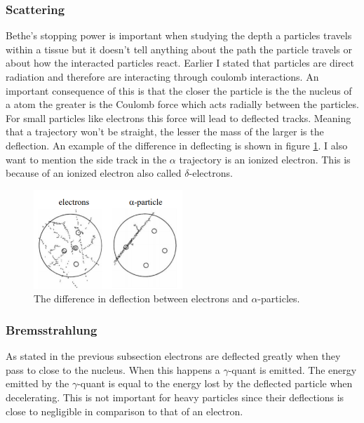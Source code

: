 \documentclass[jmp, amsmath, amssymb, reprint]{article}
\numberwithin{equation}{section}
\begin{document}
\begin{multicols}{2}
\subsubsection{Scattering}

Bethe's stopping power is important when studying the depth a particles travels within a tissue but it doesn't tell anything about the path the particle travels or about how the interacted particles react. Earlier I stated that particles are direct radiation and therefore are interacting through coulomb interactions. An important consequence of this is that the closer the particle is the the nucleus of a atom the greater is the Coulomb force which acts radially between the particles. For small particles like electrons this force will lead to deflected tracks. Meaning that a trajectory won't be straight, the lesser the mass of the larger is the deflection. An example of the difference in deflecting is shown in figure \ref{fig:scattering}. I also want to mention the side track in the \(\alpha\) trajectory is an ionized electron. This is because of an ionized electron also called \(\delta\)-electrons.

\begin{figure}[H]
	\centering
  	\includegraphics[width=0.50\textwidth]{scattering.png}
	\caption{The difference in deflection between electrons and \(\alpha\)-particles.}
	\label{fig:scattering}
\end{figure}

\subsubsection{Bremsstrahlung}

As stated in the previous subsection electrons are deflected greatly when they pass to close to the nucleus. When this happens a \(\gamma\)-quant is emitted. The energy emitted by the \(\gamma\)-quant is equal to the energy lost by the deflected particle when decelerating. This is not important for heavy particles since their deflections is close to negligible in comparison to that of an electron.


\end{multicols}
\end{document}
